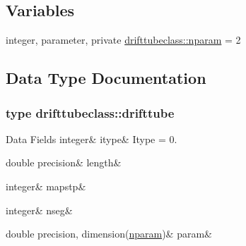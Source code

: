 \subsection*{Variables}
\begin{DoxyCompactItemize}
\item 
integer, parameter, private \mbox{\hyperlink{namespacedrifttubeclass_af382d7cef81496c1d2c2bf3ba72c4350}{drifttubeclass\+::nparam}} = 2
\end{DoxyCompactItemize}


\subsection{Data Type Documentation}
\label{structdrifttubeclass_1_1drifttube}
\subsubsection{type drifttubeclass\+::drifttube}
\begin{DoxyFields}{Data Fields}
\mbox{\label{namespacedrifttubeclass_a1155bc20a840fce9a823eba951439db2}} 
integer&
itype&
Itype = 0. \\
\hline

\mbox{\label{namespacedrifttubeclass_afec6676520da9cf2c2dd6a8298f8577b}} 
double precision&
length&
\\
\hline

\mbox{\label{namespacedrifttubeclass_a32a529cb8bf2da679620c46a2ac0bd6d}} 
integer&
mapstp&
\\
\hline

\mbox{\label{namespacedrifttubeclass_ac9c97374879fd6cd44d8ff391152ce6f}} 
integer&
nseg&
\\
\hline

\mbox{\label{namespacedrifttubeclass_abc755647bb29543bf6f4d65f7af740d4}} 
double precision, dimension(\mbox{\hyperlink{namespacedrifttubeclass_af382d7cef81496c1d2c2bf3ba72c4350}{nparam}})&
param&
\\
\hline

\end{DoxyFields}
